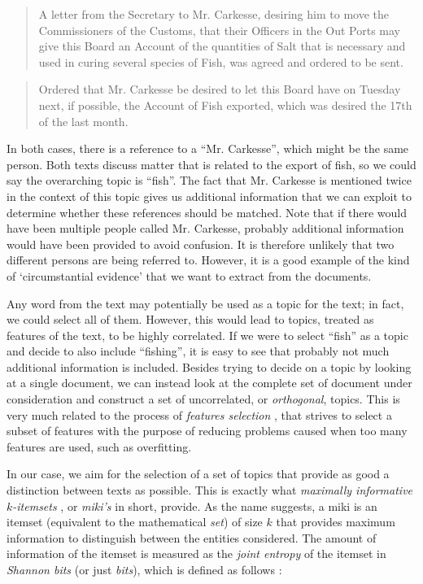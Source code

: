 \begin{quote}
    A letter from the Secretary to Mr. Carkesse, desiring him to move the Commissioners of the Customs, that their Officers in the Out Ports may give this Board an Account of the quantities of Salt that is necessary and used in curing several species of Fish, was agreed and ordered to be sent.
\end{quote}

\begin{quote}
    Ordered that Mr. Carkesse be desired to let this Board have on Tuesday next, if possible, the Account of Fish exported, which was desired the 17th of the last month.
\end{quote}

\noindent In both cases, there is a reference to a ``Mr. Carkesse'', which might be the same person.
Both texts discuss matter that is related to the export of fish, so we could say the overarching topic is ``fish''.
The fact that Mr. Carkesse is mentioned twice in the context of this topic gives us additional information that we can exploit to determine whether these references should be matched.
Note that if there would have been multiple people called Mr. Carkesse, probably additional information would have been provided to avoid confusion.
It is therefore unlikely that two different persons are being referred to.
However, it is a good example of the kind of `circumstantial evidence' that we want to extract from the documents.

Any word from the text may potentially be used as a topic for the text; in fact, we could select all of them.
However, this would lead to topics, treated as features of the text, to be highly correlated.
If we were to select ``fish'' as a topic and decide to also include ``fishing'', it is easy to see that probably not much additional information is included.
Besides trying to decide on a topic by looking at a single document, we can instead look at the complete set of document under consideration and construct a set of uncorrelated, or \emph{orthogonal}, topics.
This is very much related to the process of \emph{features selection} \citep{Knobbe2006}, that strives to select a subset of features with the purpose of reducing problems caused when too many features are used, such as overfitting.

In our case, we aim for the selection of a set of topics that provide as good a distinction between texts as possible.
This is exactly what \emph{maximally informative $k$-itemsets} \citep{Knobbe2006}, or \emph{miki's} in short, provide.
As the name suggests, a miki is an itemset (equivalent to the mathematical \emph{set}) of size $k$ that provides maximum information to distinguish between the entities considered.
The amount of information of the itemset is measured as the \emph{joint entropy} of the itemset in \emph{Shannon bits} (or just \emph{bits}), which is defined as follows \citep{Knobbe2006}:

